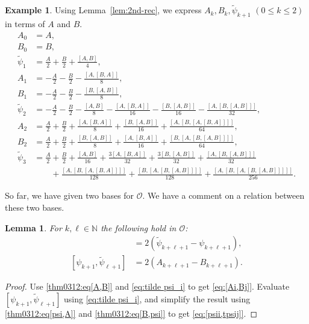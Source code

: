\documentclass[11pt]{article}%
\theoremstyle{definition}
\newtheorem{example}[definition]{Example}
\theoremstyle{plain}
\newtheorem{lemma}[definition]{Lemma}
\begin{document}
\begin{example}
Using Lemma~\ref{lem:2nd-rec}, we express $A_k, B_k, \tilde\psi_{k+1}$ $(0 \leq k \leq 2)$ in terms of $A$ and $B$.
\begin{align*}
	A_0 & = A, \\[2pt]
	B_0 & = B, \\[2pt]
	\tilde\psi_1 & = \frac{A}{2} + \frac{B}{2} + \frac{[A,B]}{4}, \\[2pt]
	A_1 & = - \frac{A}{2} - \frac{B}{2} - \frac{[A, [B, A]]}{8}, \\[2pt]
	B_1 & = - \frac{A}{2} - \frac{B}{2} - \frac{[B, [A, B]]}{8}, \\[2pt]
	\tilde\psi_2 & = - \frac{A}{2} - \frac{B}{2} - \frac{[A,B]}{8} - \frac{[A, [B, A]]}{16}  - \frac{[B, [A, B]]}{16}  - \frac{[A, [B, [A, B]]]}{32} , \\[2pt]
	A_2 & = \frac{A}{2} + \frac{B}{2} + \frac{[A, [B, A]]}{8} + \frac{[B, [A,B]]}{16} + \frac{[A, [B, [A, [B, A]]]]}{64}, \\[2pt]
	B_2 & = \frac{A}{2} + \frac{B}{2} + \frac{[B, [A, B]]}{8} + \frac{[A, [B,A]]}{16} + \frac{[B, [A, [B, [A, B]]]]}{64}, \\[2pt]
	\tilde\psi_3 & = \frac{A}{2} + \frac{B}{2} + \frac{[A,B]}{16} + \frac{3[A, [B, A]]}{32}  + \frac{3[B, [A, B]]}{32} + \frac{[A, [B, [A, B]]]}{32}  \\[2pt]
	& \qquad + \frac{[A, [B, [A, [B, A]]]]}{128}  + \frac{[B, [A, [B, [A, B]]]]}{128}  + \frac{[A, [B, [A, [B, [A, B]]]]]}{256}.
\end{align*}
\end{example}

So far, we have given two bases for $\mathcal{O}$.
We have a comment on a relation between these two bases.

\begin{lemma}\label{lem:PT5.7}
For $k, \ell \in \mathbb{N}$ the following hold in $\mathcal{O}$:
\begin{align}
	[A_k, B_\ell] & = 2(\tilde\psi_{k+\ell+1} - \psi_{k+\ell+1}), \label{eq:[Ai,Bj]} \\
	[\psi_{k+1}, \tilde\psi_{\ell+1}] & = 2(A_{k+\ell+1} - B_{k+\ell+1}). \label{eq:[psii,tpsij]}
\end{align}
\end{lemma}
\begin{proof}
Use \eqref{thm0312:eq[A,B]} and \eqref{eq:tilde psi_i} to get \eqref{eq:[Ai,Bj]}.
Evaluate $[\psi_{k+1}, \tilde\psi_{\ell+1}]$ using \eqref{eq:tilde psi_i}, and simplify the result using \eqref{thm0312:eq[psi,A]} and \eqref{thm0312:eq[B,psi]} to get \eqref{eq:[psii,tpsij]}.
\end{proof}
\end{document}
